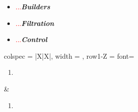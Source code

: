 \documentclass[7px]{article}
\begin{document}
\deploy
{
  \begin{itemize}
    \item[] \textcolor{red}{...}\textbf{\textsl{Builders}}
    \item[] \textcolor{red}{...}\textbf{\textsl{Filtration}}
    \item[] \textcolor{red}{...}\textbf{\textsl{Control}}
  \end{itemize}
}
{
 \raggedright
  \begin{tblr}{
      colspec = {|X|X|}, width = \linewidth,
      row{1-Z} = {font=\scriptsize}
    }
    { 
      \begin{enumerate}
        \item 
      \end{enumerate}
    } & {
      \begin{enumerate}
        \item
      \end{enumerate}
    } \\
  \end{tblr}
}
\end{document}
